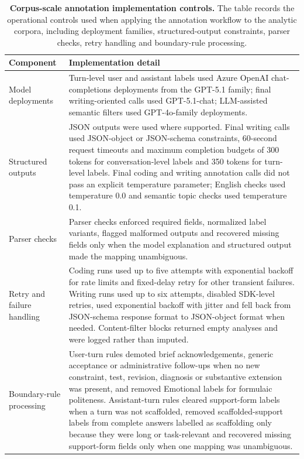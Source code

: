 \begin{table}[!htbp]
\centering
\scriptsize
\caption{\textbf{Corpus-scale annotation implementation controls.} The table records the operational controls used when applying the annotation workflow to the analytic corpora, including deployment families, structured-output constraints, parser checks, retry handling and boundary-rule processing.}
\label{tab:annotation_implementation_controls}
\setlength{\tabcolsep}{5pt}
\renewcommand{\arraystretch}{1.12}
\begin{tabularx}{\textwidth}{>{\raggedright\arraybackslash}p{}>{\raggedright\arraybackslash}X}
\toprule
Component & Implementation detail \\
\midrule
Model deployments & Turn-level user and assistant labels used Azure OpenAI chat-completions deployments from the GPT-5.1 family; final writing-oriented calls used GPT-5.1-chat; LLM-assisted semantic filters used GPT-4o-family deployments. \\
\addlinespace
Structured outputs & JSON outputs were used where supported. Final writing calls used JSON-object or JSON-schema constraints, 60-second request timeouts and maximum completion budgets of 300 tokens for conversation-level labels and 350 tokens for turn-level labels. Final coding and writing annotation calls did not pass an explicit temperature parameter; English checks used temperature 0.0 and semantic topic checks used temperature 0.1. \\
\addlinespace
Parser checks & Parser checks enforced required fields, normalized label variants, flagged malformed outputs and recovered missing fields only when the model explanation and structured output made the mapping unambiguous. \\
\addlinespace
Retry and failure handling & Coding runs used up to five attempts with exponential backoff for rate limits and fixed-delay retry for other transient failures. Writing runs used up to six attempts, disabled SDK-level retries, used exponential backoff with jitter and fell back from JSON-schema response format to JSON-object format when needed. Content-filter blocks returned empty analyses and were logged rather than imputed. \\
\addlinespace
Boundary-rule processing & User-turn rules demoted brief acknowledgements, generic acceptance or administrative follow-ups when no new constraint, test, revision, diagnosis or substantive extension was present, and removed Emotional labels for formulaic politeness. Assistant-turn rules cleared support-form labels when a turn was not scaffolded, removed scaffolded-support labels from complete answers labelled as scaffolding only because they were long or task-relevant and recovered missing support-form fields only when one mapping was unambiguous. \\
\bottomrule
\end{tabularx}
\end{table}
